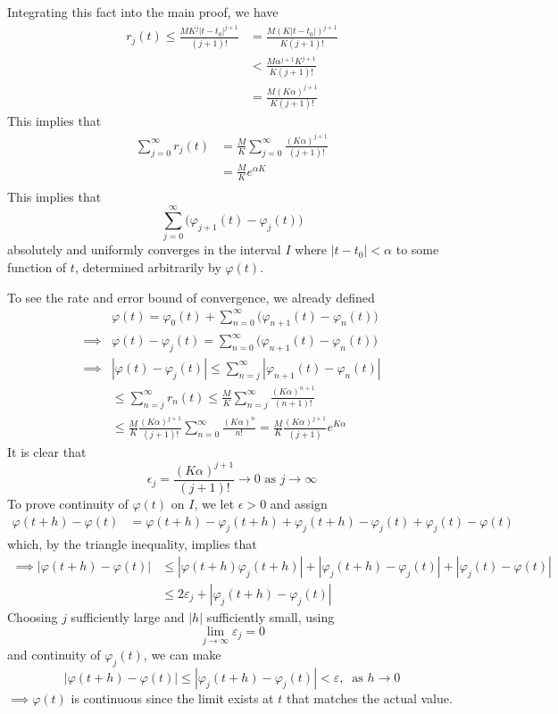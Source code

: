 \documentclass{article}
\theoremstyle{remark}
\theoremstyle{definition}
\begin{document}
Integrating this fact into the main proof, we have
\begin{align*}
    r_j (t) \leq \frac{M K^j |t - t_0|^{j+1}}{(j+1)!} & = \frac{M (K |t - t_0|)^{j+1}}{K (j+1)!}\\
    & < \frac{M \alpha^{j+1} K^{j+1}}{K (j+1)!} \\
    & = \frac{M (K \alpha)^{j+1}}{K (j+1)!} 
\end{align*}
This implies that
\begin{align*}
    \sum_{j=0}^\infty r_j (t) & = \frac{M}{K} \sum_{j=0}^\infty \frac{ (K \alpha)^{j+1}}{(j+1)!} \\
    & = \frac{M}{K} e^{\alpha K} \\
\end{align*}
This implies that 
\[\sum_{j=0}^\infty \big( \varphi_{j+1} (t) - \varphi_{j} (t) \big)\]
absolutely and uniformly converges in the interval $I$ where $|t - t_0| < \alpha$ to some function of $t$, determined arbitrarily by $\varphi (t)$. 

To see the rate and error bound of convergence, we already defined
\begin{align*}
    & \varphi(t) = \varphi_0 (t) + \sum_{n=0}^\infty \big(\varphi_{n+1} (t) - \varphi_n (t)\big) \\
    \implies & \varphi (t) - \varphi_j (t) = \sum_{n=0}^\infty \big(\varphi_{n+1} (t) - \varphi_n (t)\big) \\
    \implies & |\varphi(t) - \varphi_j (t)| \leq \sum_{n=j}^\infty |\varphi_{n+1} (t) - \varphi_n (t)| \\
    & \leq \sum_{n=j}^\infty r_n (t) \leq \frac{M}{K} \sum_{n=j}^\infty \frac{(K \alpha)^{n+1}}{(n+1)!} \\
    & \leq \frac{M}{K} \frac{(K \alpha)^{j+1}}{(j+1)!} \sum_{n=0}^\infty \frac{(K\alpha)^n}{n!} = \frac{M}{K} \frac{(K\alpha)^{j+1}}{(j+1)} e^{K \alpha}
\end{align*}
It is clear that 
\[\epsilon_j = \frac{(K \alpha)^{j+1}}{(j+1)!} \rightarrow 0 \text{ as } j \rightarrow \infty\]
To prove continuity of $\varphi(t)$ on $I$, we let $\epsilon > 0$ and assign 
\begin{align*}
    \varphi(t+h) - \varphi(t) & = \varphi(t+h) - \varphi_j (t+h) + \varphi_j (t+h) - \varphi_j (t) + \varphi_j (t) - \varphi(t) 
\end{align*}
which, by the triangle inequality, implies that
\begin{align*}
    \implies |\varphi(t+h) - \varphi(t)| & \leq |\varphi(t+h) \varphi_j  (t+h)| + |\varphi_j (t+h) - \varphi_j (t)| + |\varphi_j (t) - \varphi(t)| \\
    & \leq 2 \varepsilon_j + |\varphi_j (t+h) - \varphi_j (t)| 
\end{align*}
Choosing $j$ sufficiently large and $|h|$ sufficiently small, using 
\[\lim_{j \rightarrow \infty} \varepsilon_j = 0\]
and continuity of $\varphi_j (t)$, we can make
\[|\varphi(t+h) - \varphi(t)| \leq |\varphi_j (t+h) - \varphi_j (t)| < \varepsilon, \;\; \text{as } h \rightarrow 0\]
$\implies \varphi(t)$ is continuous since the limit exists at $t$ that matches the actual value. 
\end{document}
